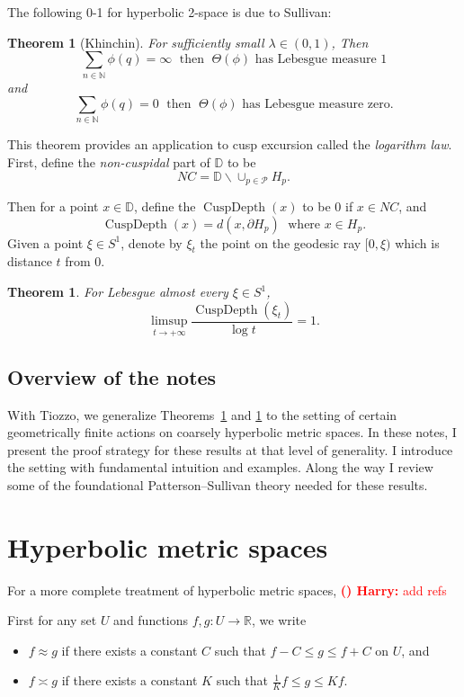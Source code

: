 \documentclass[11pt]{amsart}
\theoremstyle{plain}
\newtheorem{theorem}[proposition]{Theorem}
\theoremstyle{definition}
\theoremstyle{remark}
\DeclareMathOperator{\cuspdepth}{CuspDepth}
\newcounter{countharry}
\newcommand{\comharry}[1]{{\textcolor{red}{\textrm{{\bf (\arabic{countharry})\stepcounter{countharry} Harry:} #1}}}}
\begin{document}
The following 0-1 for hyperbolic 2-space is due to Sullivan:

\begin{theorem}[Khinchin]
  For sufficiently small $\lambda\in (0,1)$, 
  Then 
  \[
    \sum_{n\in\mathbb N} \phi(q)=\infty \; \text{ then }\; \Theta(\phi)
    \text{ has Lebesgue measure 1}
  \]
  and 
  \[
    \sum_{n\in\mathbb N} \phi(q)=0 \; \text{ then }\; \Theta(\phi)
    \text{ has Lebesgue measure zero}.
  \]
  \label{thm:khinchin_type}
\end{theorem}

This theorem provides an application to cusp excursion called the {\em logarithm
law}. First, define the {\em non-cuspidal} part of $\mathbb D$ to be 
\[
  NC=\mathbb D \smallsetminus \cup_{p\in\mathcal P} H_p.
\]

Then for a point $x\in \mathbb D$, define the $\cuspdepth(x)$
to be 0 if $x\in NC$, and 
\[
  \cuspdepth(x)=d(x,\partial H_p) \; \text{ where } x\in H_p.
\]
Given a point $\xi\in S^1$, denote by $\xi_t$ the point on the geodesic ray
$[0,\xi)$ which is distance $t$ from $0$. 

\begin{theorem}
  For Lebesgue almost every $\xi\in S^1$, 
  \[
    \limsup_{t\to+\infty} \frac{\cuspdepth(\xi_t)}{\log t}=1.
  \]
  \label{thm:loglaw}
\end{theorem}


\subsection{Overview of the notes}

With Tiozzo, we generalize Theorems~\ref{thm:khinchin_type} and
\ref{thm:loglaw} to the setting of certain geometrically finite actions on
coarsely hyperbolic metric spaces.  In these notes, I present the proof
strategy for these results at that level of generality. I introduce the
setting with fundamental intuition and examples. Along the way I review
some of the foundational Patterson--Sullivan theory needed for these
results. 

\section{Hyperbolic metric spaces}

For a more complete treatment of hyperbolic metric spaces,
\comharry{add refs} 

First for any set $U$ and functions $f,g\colon U\to \mathbb R$, we write 
\begin{itemize}
  \item $f\approx g$ if there exists a constant $C$ such that $f-C\leq g\leq
    f+C$ on $U$, and 
  \item $f\asymp g$ if there exists a constant $K$ such that $\frac1Kf\leq
    g\leq Kf$. 
\end{itemize}
\end{document}
